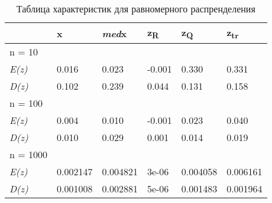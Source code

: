 \begin{table}[H]
    \centering
    \begin{tabular}{|l|l|l|l|l|l|}
    \hline
         &  x &   \textit{med}x   &   z\textsubscript{R}  &   z\textsubscript{Q}  &   z\textsubscript{tr}\\ \hline \hline
         n = 10& & & & & \\ \hline
         \textit{E(z)} &  0.016    &        0.023     &     -0.001   &       0.330  &       0.331 \\ \hline
         \textit{D(z)} &0.102      &       0.239     &     0.044    &      0.131 &       0.158   \\ \hline
       \hline
         n = 100& & & & & \\ \hline
         \textit{E(z)} & 0.004      &      0.010    &      -0.001    &      0.023    &       0.040  \\ \hline
         \textit{D(z)} & 0.010      &     0.029     &      0.001     &       0.014      &      0.019  \\ \hline
        \hline
         n = 1000& & & & & \\ \hline
         \textit{E(z)} &   0.002147 & 0.004821       &        3e-06        &       0.004058       &        0.006161 \\ \hline
         \textit{D(z)} &  0.001008       &      0.002881     &       5e-06         &       0.001483       &     0.001964  \\ \hline
    \end{tabular}
     \caption{Таблица характеристик для равномерного распренделения }
    \label{tab:my_label}
\end{table}
